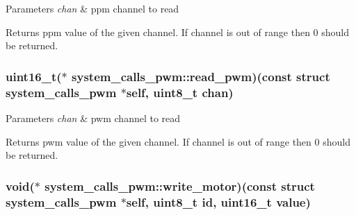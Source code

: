 \begin{DoxyParams}{Parameters}
{\em chan} & ppm channel to read \\
\hline
\end{DoxyParams}
\begin{DoxyReturn}{Returns}
ppm value of the given channel. If channel is out of range then 0 should be returned. 
\end{DoxyReturn}
\hypertarget{structsystem__calls__pwm_a3c15679bddb05e751416c7492157641c}{
\subsubsection[{read\+\_\+pwm}]{\setlength{\rightskip}{0pt plus 5cm}uint16\+\_\+t($\ast$ system\+\_\+calls\+\_\+pwm\+::read\+\_\+pwm)(const struct {\bf system\+\_\+calls\+\_\+pwm} $\ast$self, uint8\+\_\+t chan)}}\label{structsystem__calls__pwm_a3c15679bddb05e751416c7492157641c}

\begin{DoxyParams}{Parameters}
{\em chan} & pwm channel to read \\
\hline
\end{DoxyParams}
\begin{DoxyReturn}{Returns}
pwm value of the given channel. If channel is out of range then 0 should be returned. 
\end{DoxyReturn}
\hypertarget{structsystem__calls__pwm_ab4c10466eb3fc1715fd6f6705ba99c2e}{
\subsubsection[{write\+\_\+motor}]{\setlength{\rightskip}{0pt plus 5cm}void($\ast$ system\+\_\+calls\+\_\+pwm\+::write\+\_\+motor)(const struct {\bf system\+\_\+calls\+\_\+pwm} $\ast$self, uint8\+\_\+t id, uint16\+\_\+t value)}}\label{structsystem__calls__pwm_ab4c10466eb3fc1715fd6f6705ba99c2e}

